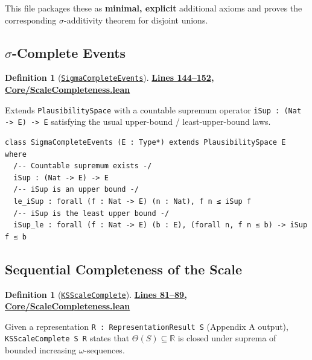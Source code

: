 \documentclass[11pt]{article}
\theoremstyle{definition}
\newtheorem{definition}[theorem]{Definition}
\theoremstyle{remark}
\begin{document}
This file packages these as \textbf{minimal, explicit} additional axioms and proves the corresponding
$\sigma$-additivity theorem for disjoint unions.

\subsection{$\sigma$-Complete Events}

\begin{definition}[\href{https://github.com/zariuq/ks-foundations-of-inference/blob/main/KnuthSkilling/Core/ScaleCompleteness.lean\#L144}{\texttt{SigmaCompleteEvents}}]
\textbf{\href{https://github.com/zariuq/ks-foundations-of-inference/blob/main/KnuthSkilling/Core/ScaleCompleteness.lean\#L144-L152}{Lines 144--152, Core/ScaleCompleteness.lean}}

Extends \texttt{PlausibilitySpace} with a countable supremum operator \texttt{iSup : (Nat -> E) -> E}
satisfying the usual upper-bound / least-upper-bound laws.
\end{definition}

\begin{lstlisting}[caption={$\sigma$-complete events structure}]
class SigmaCompleteEvents (E : Type*) extends PlausibilitySpace E where
  /-- Countable supremum exists -/
  iSup : (Nat -> E) -> E
  /-- iSup is an upper bound -/
  le_iSup : forall (f : Nat -> E) (n : Nat), f n ≤ iSup f
  /-- iSup is the least upper bound -/
  iSup_le : forall (f : Nat -> E) (b : E), (forall n, f n ≤ b) -> iSup f ≤ b
\end{lstlisting}

\subsection{Sequential Completeness of the Scale}

\begin{definition}[\href{https://github.com/zariuq/ks-foundations-of-inference/blob/main/KnuthSkilling/Core/ScaleCompleteness.lean\#L81}{\texttt{KSScaleComplete}}]
\textbf{\href{https://github.com/zariuq/ks-foundations-of-inference/blob/main/KnuthSkilling/Core/ScaleCompleteness.lean\#L81-L89}{Lines 81--89, Core/ScaleCompleteness.lean}}

Given a representation \texttt{R : RepresentationResult S} (Appendix A output), \texttt{KSScaleComplete S R}
states that $\Theta(S) \subseteq \mathbb{R}$ is closed under suprema of bounded increasing $\omega$-sequences.
\end{definition}
\end{document}
